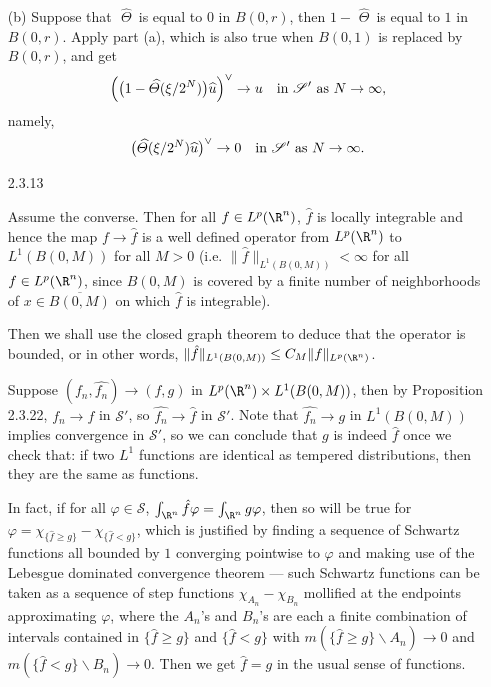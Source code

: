 \begin{itemize}
(b) Suppose that $\,\,\widehat{\!\!\varTheta}\,$ is equal to $0$ in $B(0,r)$, 
then $1-\,\,\widehat{\!\!\varTheta}\,$ is equal to $1$ in $B(0,r)$. 
Apply part (a), which is also true when $B(0,1)$ is replaced by $B(0,r)$, and get
$$\Big(\big(1-\,\,\widehat{\!\!\varTheta}(\xi/2^N)\big)\widehat{u}\Big)^\vee\rightarrow u\quad\textup{in }\mathscr{S}'\text{ as } N\rightarrow\infty,$$
namely,
$$\big(\,\,\widehat{\!\!\varTheta}(\xi/2^N)\widehat{u}\big)^\vee\rightarrow 0\quad\textup{in }\mathscr{S}'\textup{ as } N\rightarrow\infty.$$

\item[2.3.13]

Assume the converse. Then for all $f\in L^p(\R^n)$, 
$\hat{f}$ is locally integrable and hence the map $f\rightarrow\hat{f}$ 
is a well defined operator from $L^p(\R^n)$ to $L^1(B(0,M))$ for all $M>0$ 
(i.e. $\|\hat{f}\|_{L^1(B(0,M))}<\infty$ for all $f\in L^p(\R^n)$, 
since $B(0,M)$ is covered by a finite number of neighborhoods of 
$x\in \overline{B(0,M)}$ on which $\hat{f}$ is integrable).

Then we shall use the closed graph theorem to deduce that the operator is 
bounded, or in other words, $\|\hat{f}\|_{L^1(B(0,M))}\leq C_M\|f\|_{L^p(\R^n)}$.

Suppose $(f_n,\hat{f_n})\rightarrow(f,g)$ in $L^p(\R^n)\times L^1(B(0,M))$, 
then by Proposition 2.3.22, $f_n\rightarrow f$ in $\mathscr{S}'$, 
so $\hat{f_n}\rightarrow \hat{f}$ in $\mathscr{S}'$. 
Note that $\hat{f_n}\rightarrow g$ in $L^1(B(0,M))$ implies convergence in $\mathscr{S}'$, 
so we can conclude that $g$ is indeed $\hat{f}$ once we check that: 
if two $L^1$ functions are identical as tempered distributions, 
then they are the same as functions.

In fact, if for all $\varphi\in\mathscr{S}$, $\int_{\R^n}\hat{f}\varphi=\int_{\R^n}g\varphi$, 
then so will be true for $\varphi=\chi_{\{\hat{f}\geq g\}}-\chi_{\{\hat{f}<g\}}$, 
which is justified by finding a sequence of Schwartz functions all bounded by $1$ 
converging pointwise to $\varphi$ and making use of the Lebesgue dominated convergence theorem 
--- such Schwartz functions can be taken as a sequence of step functions $\chi_{A_n}-\chi_{B_n}$ 
mollified at the endpoints approximating $\varphi$, where the $A_n$'s and $B_n$'s are 
each a finite combination of intervals contained in $\{\hat{f}\geq g\}$ and $\{\hat{f}<g\}$ 
with $m({\{\hat{f}\geq g\}}\backslash A_n)\rightarrow0$ and $m({\{\hat{f}<g\}}\backslash B_n)\rightarrow0$. 
Then we get $\hat{f}=g$ in the usual sense of functions.


\end{itemize}
